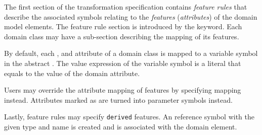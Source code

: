 The first section of the transformation specification contains \emph{feature rules} that describe the associated symbols relating to the \emph{features} (\emph{attributes}) of the domain model elements. The feature rule section is introduced by the  keyword. Each domain class may have a sub-section describing the mapping of its features.

By default, each ,  and  attribute of a domain class is mapped to a  variable symbol in the abstract . The value expression of the variable symbol is a literal that equals to the value of the domain attribute.

Users may override the attribute mapping of  features by specifying  mapping instead. Attributes marked as  are turned into parameter symbols instead.

Lastly, feature rules may specify \texttt{derived} features. An  reference symbol with the given type and name is created and is associated with the domain element.

